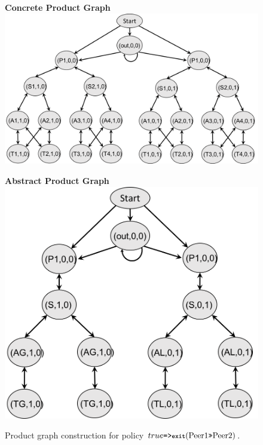 \documentclass{sig-alternate-10pt}
\newcommand{\KW}[1]{\texttt{\small\bfseries{#1}}}
\newcommand{\Prefer}{\texttt{>>}}
\newcommand{\Path}{\texttt{=>}}
\newcommand{\Exit}{\KW{exit}}
\newcommand{\hdr}[2]{\flushleft \chdr{\hspace{5mm}#1}{#2}}
\newcommand{\chdr}[2]{\textbf{#1} {#2} \\ \centering}%
\begin{document}
\begin{figure}[t!]
  \vspace{2em}
  \begin{minipage}[t]{.6\linewidth}
    \hdr{Concrete Product Graph}{}
    \includegraphics[width=.9\columnwidth]{figures/pg-con}
  \end{minipage}%
  \begin{minipage}[t]{.4\linewidth}
  \hdr{Abstract Product Graph}{}
    \includegraphics[width=.9\columnwidth]{figures/pg-abs}

  \end{minipage}%

  \hrulefill
  \vspace*{.4em}%

  \caption{Product graph construction for policy $true \Path \Exit(\text{Peer1} \Prefer \text{Peer2})$.}
  \label{fig:example-compilation}
\end{figure}
\end{document}
